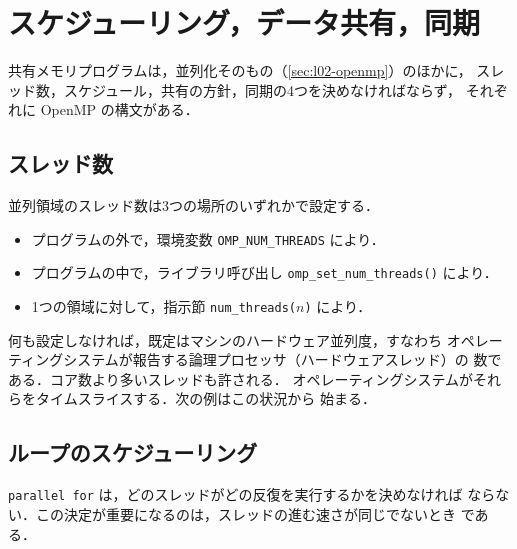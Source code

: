 \documentclass[../main.tex]{subfiles}
\begin{document}
\section{スケジューリング，データ共有，同期}
\label{sec:l02-scheduling}

共有メモリプログラムは，並列化そのもの（\cref{sec:l02-openmp}）のほかに，
スレッド数，スケジュール，共有の方針，同期の4つを決めなければならず，
それぞれに OpenMP の構文がある．

\subsection{スレッド数}

並列領域のスレッド数は3つの場所のいずれかで設定する．
\begin{itemize}
  \item プログラムの外で，環境変数 \texttt{OMP\_NUM\_THREADS} により．
  \item プログラムの中で，ライブラリ呼び出し
    \texttt{omp\_set\_num\_threads()} により．
  \item 1つの領域に対して，指示節 \texttt{num\_threads(}$n$\texttt{)} により．
\end{itemize}
何も設定しなければ，既定はマシンのハードウェア並列度，すなわち
オペレーティングシステムが報告する論理プロセッサ（ハードウェアスレッド）の
数である．コア数より多いスレッドも許される．
オペレーティングシステムがそれらをタイムスライスする．次の例はこの状況から
始まる．

\subsection{ループのスケジューリング}

\texttt{parallel for} は，どのスレッドがどの反復を実行するかを決めなければ
ならない．この決定が重要になるのは，スレッドの進む速さが同じでないとき
である．
\end{document}
